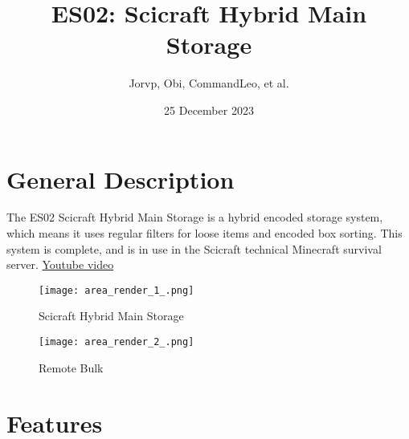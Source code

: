 \documentclass[10pt]{datasheet}
\title{ES02: Scicraft Hybrid Main Storage}
\author{Jorvp, Obi, CommandLeo, et al.}
\date{25 December 2023}
\begin{document}
\maketitle


\section{General Description}
The ES02 Scicraft Hybrid Main Storage is a hybrid encoded storage system, which means it uses regular filters for loose items and encoded box sorting. This system is complete, and is in use in the Scicraft technical Minecraft survival server. \href{https://www.youtube.com/watch?v=8VbCW-Fqjhw}{Youtube video}



\vfill\break

\begin{figure}[h]
    \centering
    \texttt{[image: area\_render\_1\_.png]}
    \caption{\centering Scicraft Hybrid Main Storage}
\end{figure}

\begin{figure}[h]
    \centering
    \texttt{[image: area\_render\_2\_.png]}
    \caption{\centering Remote Bulk}
\end{figure}




\onecolumn

\section{Features}
\end{document}
